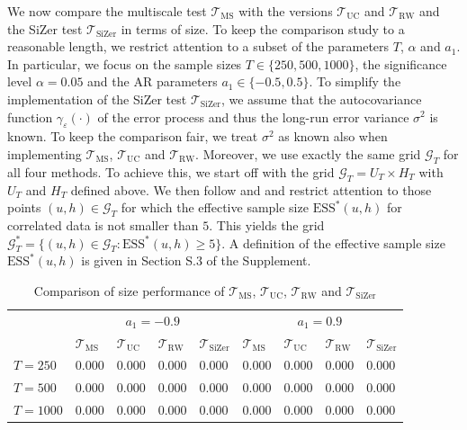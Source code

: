 We now compare the multiscale test $\mathcal{T}_{\text{MS}}$ with the versions $\mathcal{T}_{\text{UC}}$ and $\mathcal{T}_{\text{RW}}$ and the SiZer test $\mathcal{T}_{\text{SiZer}}$ in terms of size. To keep the comparison study to a reasonable length, we restrict attention to a subset of the parameters $T$, $\alpha$ and $a_1$. In particular, we focus on the sample sizes $T \in \{250,500,1000\}$, the significance level $\alpha=0.05$ and the AR parameters $a_1 \in \{-0.5,0.5\}$. To simplify the implementation of the SiZer test $\mathcal{T}_{\text{SiZer}}$, we assume that the autocovariance function $\gamma_\varepsilon(\cdot)$ of the error process and thus the long-run error variance $\sigma^2$ is known. To keep the comparison fair, we treat $\sigma^2$ as known also when implementing $\mathcal{T}_{\text{MS}}$, $\mathcal{T}_{\text{UC}}$ and $\mathcal{T}_{\text{RW}}$. Moreover, we use exactly the same grid $\mathcal{G}_T$ for all four methods. To achieve this, we start off with the grid $\mathcal{G}_T = U_T \times H_T$ with $U_T$ and $H_T$ defined above. We then follow \cite{Rondonotti2007} and \cite{ParkHannigKang2009} and restrict attention to those points $(u,h) \in \mathcal{G}_T$ for which the effective sample size $\text{ESS}^*(u,h)$ for correlated data is not smaller than $5$. This yields the grid $\mathcal{G}_T^* = \{ (u, h) \in \mathcal{G}_T : \text{ESS}^*(u, h) \geq 5 \}$. A definition of the effective sample size $\text{ESS}^*(u,h)$ is given in Section S.3 of the Supplement. %



\begin{table}[t!]
\footnotesize{
\caption{Comparison of size performance of $\mathcal{T}_{\text{MS}}$, $\mathcal{T}_{\text{UC}}$, $\mathcal{T}_{\text{RW}}$ and $\mathcal{T}_{\text{SiZer}}$}\label{tab:sim:size3}
\begin{tabularx}{\textwidth}{l@{\hskip 20pt} Z@{\hskip 6pt}Z@{\hskip 6pt}Z@{\hskip 6pt}Z@{\hskip 20pt}Z@{\hskip 6pt}Z@{\hskip 6pt}Z@{\hskip 6pt}Z}
\toprule
 &  &  \\
 & $\mathcal{T}_{\text{MS}}$ & $\mathcal{T}_{\text{UC}}$ & $\mathcal{T}_{\text{RW}}$ & $\mathcal{T}_{\text{SiZer}}$ & $\mathcal{T}_{\text{MS}}$ & $\mathcal{T}_{\text{UC}}$ & $\mathcal{T}_{\text{RW}}$ & $\mathcal{T}_{\text{SiZer}}$ \\
$T=250$  & 0.000 & 0.000 & 0.000 & 0.000 & 0.000 & 0.000 & 0.000 & 0.000 \\ 
$T=500$  & 0.000 & 0.000 & 0.000 & 0.000 & 0.000 & 0.000 & 0.000 & 0.000 \\
$T=1000$ & 0.000 & 0.000 & 0.000 & 0.000 & 0.000 & 0.000 & 0.000 & 0.000 \\
\bottomrule
\end{tabularx}}
\end{table}


